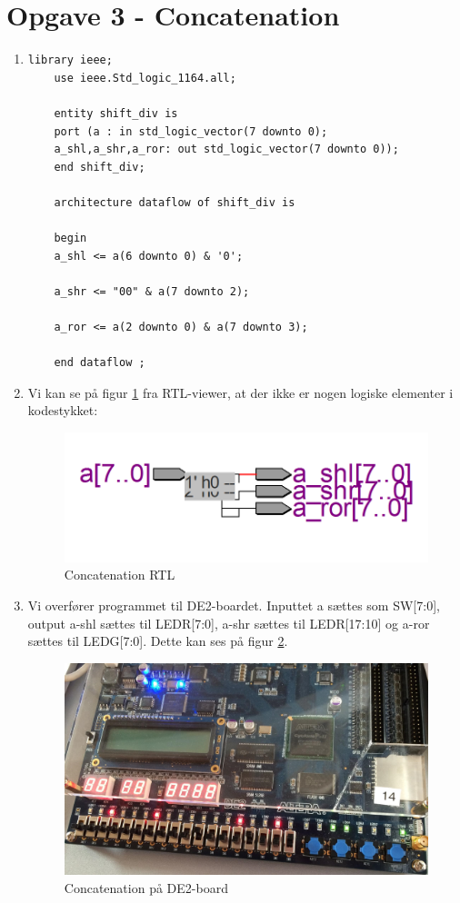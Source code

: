 \newpage
\section{Opgave 3 - Concatenation}
\begin{enumerate}
	\item[1)]
		\begin{lstlisting}[caption={Concatenation kode},label={lst:ConcatenationCode}]
	library ieee;
	use ieee.Std_logic_1164.all;
	
	entity shift_div is
	port (a : in std_logic_vector(7 downto 0);
	a_shl,a_shr,a_ror: out std_logic_vector(7 downto 0));
	end shift_div; 
	
	architecture dataflow of shift_div is
	
	begin 
	a_shl <= a(6 downto 0) & '0';
	
	a_shr <= "00" & a(7 downto 2);
	
	a_ror <= a(2 downto 0) & a(7 downto 3);
	
	end dataflow ;

		\end{lstlisting}
	\item[2)]
Vi kan se på figur \ref{fig:concatenationRTL} fra RTL-viewer, at der ikke er nogen logiske elementer i kodestykket:
	\begin{figure}[H]
		\centering
		\includegraphics[scale=0.5]{pictures/Oevelse3/Concatenation_RTL.png}
		\caption{Concatenation RTL}
		\label{fig:concatenationRTL}
	\end{figure}

	
	\item[3)]
Vi overfører programmet til DE2-boardet. Inputtet a sættes som SW[7:0], output a-shl sættes til LEDR[7:0], a-shr sættes til LEDR[17:10] og a-ror sættes til LEDG[7:0]. Dette kan ses på figur \ref{fig:concatenation_DE2board}.

	\begin{figure}[H]
		\centering
		\includegraphics[scale=0.23]{pictures/Oevelse3/Concatenation_DE2board.jpg}
		\caption{Concatenation på DE2-board}
		\label{fig:concatenation_DE2board}
	\end{figure}

\end{enumerate}